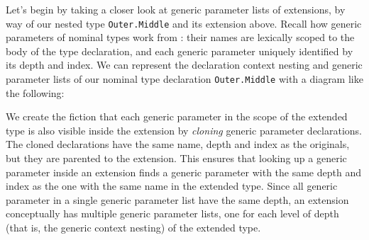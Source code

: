 \documentclass[../generics]{subfiles}
\begin{document}
Let's begin by taking a closer look at generic parameter lists of extensions, by way of our nested type \texttt{Outer.Middle} and its extension above. Recall how generic parameters of nominal types work from : their names are lexically scoped to the body of the type declaration, and each generic parameter uniquely identified by its depth and index. We can represent the declaration context nesting and generic parameter lists of our nominal type declaration \texttt{Outer.Middle} with a diagram like the following:
\begin{quote}
\end{quote}

We create the fiction that each generic parameter in the scope of the extended type is also visible inside the extension by \emph{cloning} generic parameter declarations. The cloned declarations have the same name, depth and index as the originals, but they are parented to the extension. This ensures that looking up a generic parameter inside an extension finds a generic parameter with the same depth and index as the one with the same name in the extended type.  Since all generic parameter in a single generic parameter list have the same depth, an extension conceptually has multiple generic parameter lists, one for each level of depth (that is, the generic context nesting) of the extended type.
\end{document}
